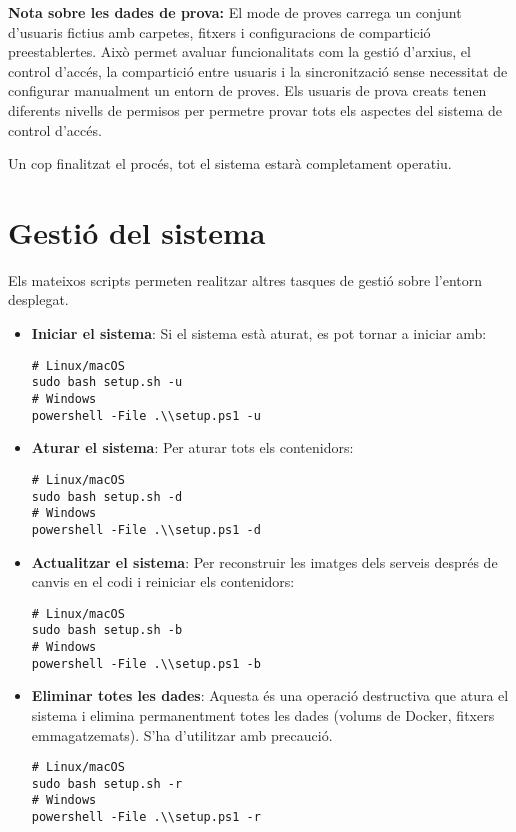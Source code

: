 \textbf{Nota sobre les dades de prova:} El mode de proves carrega un conjunt d'usuaris fictius amb carpetes, fitxers i configuracions de compartició preestablertes. Això permet avaluar funcionalitats com la gestió d'arxius, el control d'accés, la compartició entre usuaris i la sincronització sense necessitat de configurar manualment un entorn de proves. Els usuaris de prova creats tenen diferents nivells de permisos per permetre provar tots els aspectes del sistema de control d'accés.

Un cop finalitzat el procés, tot el sistema estarà completament operatiu.

\section{Gestió del sistema}
Els mateixos scripts permeten realitzar altres tasques de gestió sobre l'entorn desplegat.

\begin{itemize}
    \item \textbf{Iniciar el sistema}: Si el sistema està aturat, es pot tornar a iniciar amb:
    \begin{verbatim}
# Linux/macOS
sudo bash setup.sh -u
# Windows
powershell -File .\\setup.ps1 -u
\end{verbatim}

    \item \textbf{Aturar el sistema}: Per aturar tots els contenidors:
    \begin{verbatim}
# Linux/macOS
sudo bash setup.sh -d
# Windows
powershell -File .\\setup.ps1 -d
\end{verbatim}

    \item \textbf{Actualitzar el sistema}: Per reconstruir les imatges dels serveis després de canvis en el codi i reiniciar els contenidors:
    \begin{verbatim}
# Linux/macOS
sudo bash setup.sh -b
# Windows
powershell -File .\\setup.ps1 -b
\end{verbatim}

    \item \textbf{Eliminar totes les dades}: Aquesta és una operació destructiva que atura el sistema i elimina permanentment totes les dades (volums de Docker, fitxers emmagatzemats). S'ha d'utilitzar amb precaució.
    \begin{verbatim}
# Linux/macOS
sudo bash setup.sh -r
# Windows
powershell -File .\\setup.ps1 -r
\end{verbatim}
\end{itemize}

